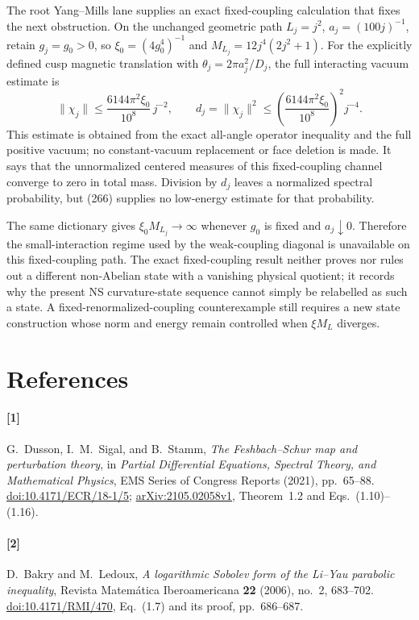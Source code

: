 \documentclass[11pt]{article}
\begin{document}
The root Yang--Mills lane supplies an exact fixed-coupling calculation that fixes the next obstruction.  On the unchanged geometric path $L_j=j^2$, $a_j=(100j)^{-1}$, retain $g_j=g_0>0$, so $\xi_0=(4g_0^4)^{-1}$ and $M_{L_j}=12j^4(2j^2+1)$.  For the explicitly defined cusp magnetic translation with $\theta_j=2\pi a_j^2/D_j$, the full interacting vacuum estimate is
\[
 \|\chi_j\|\le \frac{6144\pi^2\xi_0}{10^8}\,j^{-2},
 \qquad
 d_j=\|\chi_j\|^2\le
 \left(\frac{6144\pi^2\xi_0}{10^8}\right)^2j^{-4}.
 \tag{266}
\]
This estimate is obtained from the exact all-angle operator inequality and the full positive vacuum; no constant-vacuum replacement or face deletion is made.  It says that the unnormalized centered measures of this fixed-coupling channel converge to zero in total mass.  Division by $d_j$ leaves a normalized spectral probability, but (266) supplies no low-energy estimate for that probability.

The same dictionary gives $\xi_0M_{L_j}\to\infty$ whenever $g_0$ is fixed and $a_j\downarrow0$.  Therefore the small-interaction regime used by the weak-coupling diagonal is unavailable on this fixed-coupling path.  The exact fixed-coupling result neither proves nor rules out a different non-Abelian state with a vanishing physical quotient; it records why the present NS curvature-state sequence cannot simply be relabelled as such a state.  A fixed-renormalized-coupling counterexample still requires a new state construction whose norm and energy remain controlled when $\xi M_L$ diverges.





\clearpage
\section*{References}
\paragraph{[1]}
G.~Dusson, I.~M.~Sigal, and B.~Stamm,
\emph{The Feshbach--Schur map and perturbation theory},
in \emph{Partial Differential Equations, Spectral Theory, and Mathematical
Physics}, EMS Series of Congress Reports (2021), pp.~65--88.
\href{https://doi.org/10.4171/ECR/18-1/5}{doi:10.4171/ECR/18-1/5};
\href{https://arxiv.org/abs/2105.02058v1}{arXiv:2105.02058v1},
Theorem~1.2 and Eqs.~(1.10)--(1.16).
\paragraph{[2]}
D.~Bakry and M.~Ledoux,
\emph{A logarithmic Sobolev form of the Li--Yau parabolic inequality},
Revista Matem\'atica Iberoamericana \textbf{22} (2006), no.~2, 683--702.
\href{https://doi.org/10.4171/RMI/470}{doi:10.4171/RMI/470},
Eq.~(1.7) and its proof, pp.~686--687.
\end{document}

